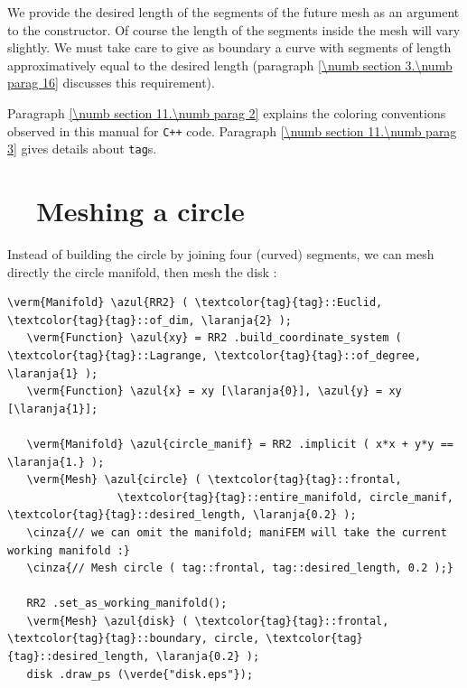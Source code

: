 We provide the desired length of the segments of the future mesh as an argument to the
constructor.
Of course the length of the segments inside the mesh will vary slightly.
We must take care to give as boundary a curve with segments of length approximatively equal
to the desired length (paragraph \ref{\numb section 3.\numb parag 16} discusses
this requirement).

Paragraph \ref{\numb section 11.\numb parag 2} explains the coloring conventions observed
in this manual for {\tt C++} code.
Paragraph \ref{\numb section 11.\numb parag 3} gives details about {\small\tt\textcolor{tag}{tag}}s.


\section{~~Meshing a circle}\label{\numb section 3.\numb parag 2}

Instead of building the circle by joining four (curved) segments, we can mesh directly
the circle manifold, then mesh the disk :

\begin{Verbatim}[commandchars=\\\{\},formatcom=\small\tt,frame=single,
   label=parag-\ref{\numb section 3.\numb parag 2}.cpp,rulecolor=\color{moldura},
   baselinestretch=0.94,framesep=2mm                                            ]
   \verm{Manifold} \azul{RR2} ( \textcolor{tag}{tag}::Euclid, \textcolor{tag}{tag}::of_dim, \laranja{2} );
   \verm{Function} \azul{xy} = RR2 .build_coordinate_system ( \textcolor{tag}{tag}::Lagrange, \textcolor{tag}{tag}::of_degree, \laranja{1} );
   \verm{Function} \azul{x} = xy [\laranja{0}], \azul{y} = xy [\laranja{1}];
   
   \verm{Manifold} \azul{circle_manif} = RR2 .implicit ( x*x + y*y == \laranja{1.} );
   \verm{Mesh} \azul{circle} ( \textcolor{tag}{tag}::frontal,
                 \textcolor{tag}{tag}::entire_manifold, circle_manif, \textcolor{tag}{tag}::desired_length, \laranja{0.2} );
   \cinza{// we can omit the manifold; maniFEM will take the current working manifold :}
   \cinza{// Mesh circle ( tag::frontal, tag::desired_length, 0.2 );}
   
   RR2 .set_as_working_manifold();
   \verm{Mesh} \azul{disk} ( \textcolor{tag}{tag}::frontal, \textcolor{tag}{tag}::boundary, circle, \textcolor{tag}{tag}::desired_length, \laranja{0.2} );
   disk .draw_ps (\verde{"disk.eps"});
\end{Verbatim}

